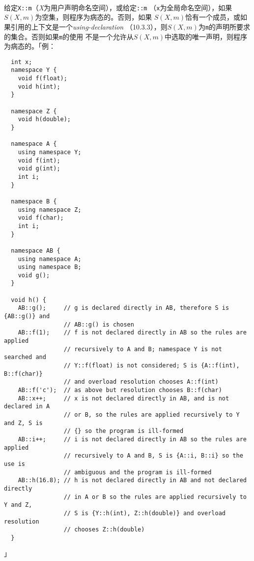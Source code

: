 \paragraph{}
给定\texttt{X::m}（\textit{X}为用户声明命名空间），或给定\texttt{::m}
（\texttt{x}为全局命名空间），如果$S(X, m)$为空集，则程序为病态的。否则，如果
$S(X, m)$恰有一个成员，或如果引用的上下文是一个\textit{using-declaration}
（10.3.3），则$S(X, m)$为\texttt{m}的声明所要求的集合。否则如果\texttt{m}的使用
不是一个允许从$S(X, m)$中选取的唯一声明，则程序为病态的。「例：
\begin{lstlisting}
  int x;
  namespace Y {
    void f(float);
    void h(int);
  }

  namespace Z {
    void h(double);
  }

  namespace A {
    using namespace Y;
    void f(int);
    void g(int);
    int i;
  }

  namespace B {
    using namespace Z;
    void f(char);
    int i;
  }

  namespace AB {
    using namespace A;
    using namespace B;
    void g();
  }

  void h() {
    AB::g();     // g is declared directly in AB, therefore S is {AB::g()} and
                 // AB::g() is chosen
    AB::f(1);    // f is not declared directly in AB so the rules are applied
                 // recursively to A and B; namespace Y is not searched and
                 // Y::f(float) is not considered; S is {A::f(int), B::f(char)}
                 // and overload resolution chooses A::f(int)
    AB::f('c');  // as above but resolution chooses B::f(char)
    AB::x++;     // x is not declared directly in AB, and is not declared in A
                 // or B, so the rules are applied recursively to Y and Z, S is
                 // {} so the program is ill-formed
    AB::i++;     // i is not declared directly in AB so the rules are applied
                 // recursively to A and B, S is {A::i, B::i} so the use is
                 // ambiguous and the program is ill-formed
    AB::h(16.8); // h is not declared directly in AB and not declared directly
                 // in A or B so the rules are applied recursively to Y and Z,
                 // S is {Y::h(int), Z::h(double)} and overload resolution
                 // chooses Z::h(double)
  }
\end{lstlisting}」

